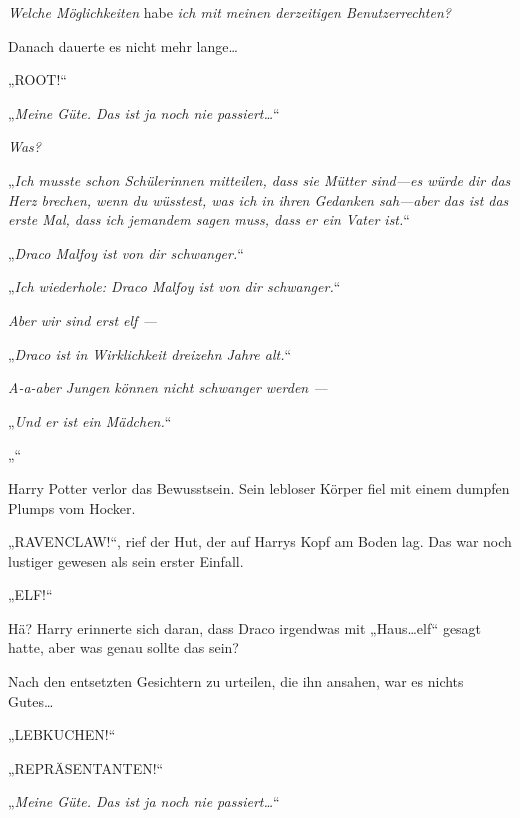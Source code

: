 \emph{Welche Möglichkeiten} habe \emph{ich mit meinen derzeitigen Benutzerrechten?}

Danach dauerte es nicht mehr lange…

„ROOT!“

\later

„\emph{Meine Güte. Das ist ja noch nie passiert…}“

\emph{Was?}

„\emph{Ich musste schon Schülerinnen mitteilen, dass sie Mütter sind—es würde dir das Herz brechen, wenn du wüsstest, was ich in ihren Gedanken sah—aber das ist das erste Mal, dass ich jemandem sagen muss, dass er ein Vater ist.}“

\emph{}

„\emph{Draco Malfoy ist von dir schwanger.}“

\emph{}

„\emph{Ich wiederhole: Draco Malfoy ist von dir schwanger.}“

\emph{Aber wir sind erst elf —}

„\emph{Draco ist in Wirklichkeit dreizehn Jahre alt.}“

\emph{A-a-aber Jungen können nicht schwanger werden —}

„\emph{Und er ist ein Mädchen.}“

\emph{}

„\emph{}“

Harry Potter verlor das Bewusstsein. Sein lebloser Körper fiel mit einem dumpfen Plumps vom Hocker.

„RAVENCLAW!“, rief der Hut, der auf Harrys Kopf am Boden lag. Das war noch lustiger gewesen als sein erster Einfall.

\later

„ELF!“

Hä? Harry erinnerte sich daran, dass Draco irgendwas mit „Haus…elf“ gesagt hatte, aber was genau sollte das sein?

Nach den entsetzten Gesichtern zu urteilen, die ihn ansahen, war es nichts Gutes…

\later

„LEBKUCHEN!“

\later

„REPRÄSENTANTEN!“

\later

„\emph{Meine Güte. Das ist ja noch nie passiert…}“

